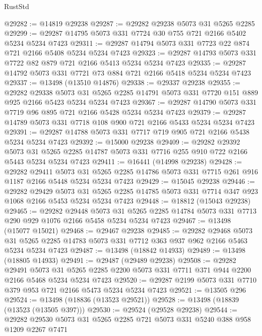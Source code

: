 \begin{lexlean}{RustStd}
\begin{coremodule}
@29282 := @14819 @29238
@29287 := @29282 @29238 @5073 @31 @5265 @2285
@29299 := @29287 @14795 @5073 @331 @7724 @30 @755 @721 @2166 @5402 @5234 @5234 @7423
@29311 := @29287 @14794 @5073 @331 @7723 @22 @874 @721 @2166 @5408 @5234 @5234 @7423
@29323 := @29287 @14793 @5073 @331 @7722 @82 @879 @721 @2166 @5413 @5234 @5234 @7423
@29335 := @29287 @14792 @5073 @331 @7721 @73 @884 @721 @2166 @5418 @5234 @5234 @7423
@29337 := @13498 (@13510 @14876)
@29338 := @29337 @29238
@29355 := @29282
    @29338
    @5073
    @31
    @5265
    @2285
    @14791
    @5073
    @331
    @7720
    @151
    @889
    @925
    @2166
    @5423
    @5234
    @5234
    @7423
@29367 := @29287 @14790 @5073 @331 @7719 @96 @895 @721 @2166 @5428 @5234 @5234 @7423
@29379 := @29287 @14789 @5073 @331 @7718 @108 @900 @721 @2166 @5433 @5234 @5234 @7423
@29391 := @29287 @14788 @5073 @331 @7717 @719 @905 @721 @2166 @5438 @5234 @5234 @7423
@29392 := @15000 @29238
@29409 := @29282
    @29392
    @5073
    @31
    @5265
    @2285
    @14787
    @5073
    @331
    @7716
    @255
    @910
    @722
    @2166
    @5443
    @5234
    @5234
    @7423
@29411 := @16441 (@14998 @29238)
@29428 := @29282
    @29411
    @5073
    @31
    @5265
    @2285
    @14786
    @5073
    @331
    @7715
    @261
    @916
    @1187
    @2166
    @5448
    @5234
    @5234
    @7423
@29429 := @15045 @29238
@29446 := @29282
    @29429
    @5073
    @31
    @5265
    @2285
    @14785
    @5073
    @331
    @7714
    @347
    @923
    @1068
    @2166
    @5453
    @5234
    @5234
    @7423
@29448 := @18812 (@15043 @29238)
@29465 := @29282
    @29448
    @5073
    @31
    @5265
    @2285
    @14784
    @5073
    @331
    @7713
    @290
    @929
    @1076
    @2166
    @5458
    @5234
    @5234
    @7423
@29467 := @13498 (@15077 @15021)
@29468 := @29467 @29238
@29485 := @29282
    @29468
    @5073
    @31
    @5265
    @2285
    @14783
    @5073
    @331
    @7712
    @363
    @937
    @962
    @2166
    @5463
    @5234
    @5234
    @7423
@29487 := @13498 (@18842 @14933)
@29489 := @13498 (@18805 @14933)
@29491 := @29487 (@29489 @29238)
@29508 := @29282
    @29491
    @5073
    @31
    @5265
    @2285
    @2200
    @5073
    @331
    @7711
    @371
    @944
    @2200
    @2166
    @5468
    @5234
    @5234
    @7423
@29520 := @29287 @2199 @5073 @331 @7710 @379 @953 @721 @2166 @5473 @5234 @5234 @7423
@29521 := @13505 @296
@29524 := @13498 (@18836 (@13523 @29521))
@29528 := @13498 (@18839 (@13523 (@13505 @397)))
@29530 := @29524 (@29528 @29238)
@29544 := @29282 @29530 @5073 @31 @5265 @2285 @721 @5073 @331 @5240 @388 @958 @1209 @2267 @7471

\end{coremodule}
\end{lexlean}
